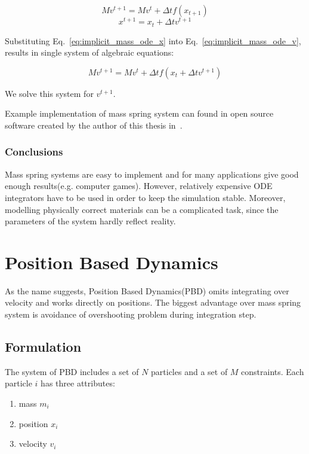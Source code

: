 \documentclass[en]{minipw} %
\begin{document}
\begin{equation}
\label{eq:implicit_mass_ode_v}
M v^{t+1} = M v^{t} + \Delta t f(x_{t+1})
\end{equation}
\begin{equation}
\label{eq:implicit_mass_ode_x}
x^{t+1} = x_{t} + \Delta t v^{t+1}
\end{equation}

Substituting Eq.~\ref{eq:implicit_mass_ode_x} into Eq.~\ref{eq:implicit_mass_ode_v}, results in single system of algebraic equations:

\begin{equation}
M v^{t+1} = M v^{t} + \Delta t f(x_{t} + \Delta t v^{t+1})
\end{equation}

We solve this system for $v^{t+1}$.

Example implementation of mass spring system can found in open source software created by the author of this thesis in~\cite{JC-MassSpring}. 

\subsubsection{Conclusions}
Mass spring systems are easy to implement and for many applications give good enough results(e.g. computer games). However, relatively expensive ODE integrators have to be used in order to keep the simulation stable. Moreover, modelling physically correct materials can be a complicated task, since the parameters of the system hardly reflect reality.

\section{Position Based Dynamics}
As the name suggests, Position Based Dynamics(PBD) omits integrating over velocity and works directly on positions. The biggest advantage over mass spring system is avoidance of overshooting problem during integration step.
\subsection{Formulation}
The system of PBD includes a set of $N$ particles and a set of $M$ constraints. Each particle $i$ has three attributes: 
\begin{enumerate}
\item mass $m_i$
\item position $x_i$
\item velocity $v_i$
\end{enumerate}
\end{document}
